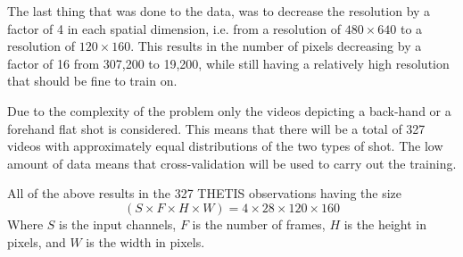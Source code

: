 The last thing that was done to the data, was to decrease the resolution by a factor of 4 in each spatial dimension, i.e. from a resolution of $480\times 640$ to a resolution of $120\times 160$. This results in the number of pixels decreasing by a factor of 16 from 307,200 to 19,200, while still having a relatively high resolution that should be fine to train on. 

Due to the complexity of the problem only the videos depicting a back-hand or a forehand flat shot is considered. This means that there will be a total of 327 videos with approximately equal distributions of the two types of shot. The low amount of data means that cross-validation will be used to carry out the training.

All of the above results in the 327 THETIS observations having the size \begin{equation}
    (S \times F \times H \times W) = 4\times 28 \times 120 \times 160
\end{equation}
Where $S$ is the input channels, $F$ is the number of frames, $H$ is the height in pixels, and $W$ is the width in pixels.